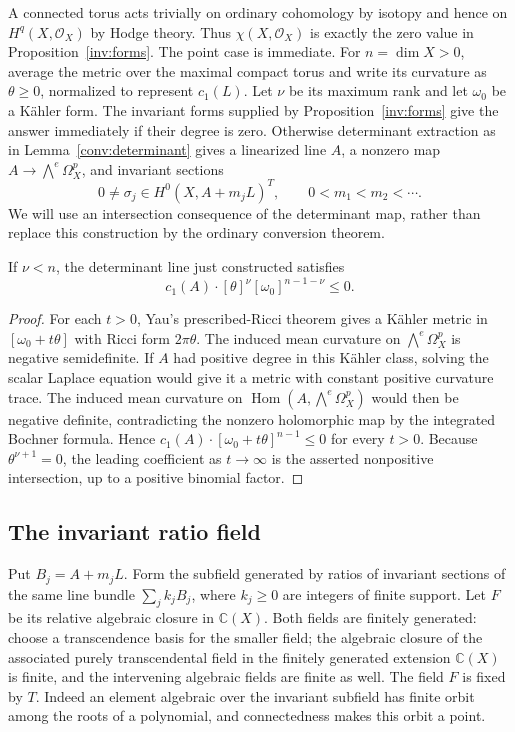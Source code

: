 A connected torus acts trivially on ordinary cohomology by isotopy and
hence on $H^q(X,\mathcal O_X)$ by Hodge theory.  Thus
$\chi(X,\mathcal O_X)$ is exactly the zero value in
Proposition~\ref{inv:forms}.  The point case is immediate.  For
$n=\dim X>0$, average the metric over the maximal compact torus and
write its curvature as $\theta\ge0$, normalized to represent $c_1(L)$.
Let $\nu$ be its maximum rank and let $\omega_0$ be a K\"ahler form.
The invariant forms supplied by Proposition~\ref{inv:forms} give the
answer immediately if their degree is zero.  Otherwise determinant
extraction as in Lemma~\ref{conv:determinant} gives a linearized line
$A$, a nonzero map $A\to\bigwedge^e\Omega_X^p$, and invariant sections
\begin{equation}\label{inv:determinant-sequence}
 0\ne\sigma_j\in H^0(X,A+m_jL)^T,
 \qquad 0<m_1<m_2<\cdots.
\end{equation}
We will use an intersection consequence of the determinant map, rather
than replace this construction by the ordinary conversion theorem.

\begin{lemma}\label{inv:null-slope}
If $\nu<n$, the determinant line just constructed satisfies
\[
 c_1(A)\cdot[\theta]^\nu[\omega_0]^{n-1-\nu}\le0.
\]
\end{lemma}
\begin{proof}
For each $t>0$, Yau's prescribed-Ricci theorem \cite{Yau1978} gives
a K\"ahler metric in $[\omega_0+t\theta]$ with Ricci form
$2\pi\theta$.  The induced mean curvature on
$\bigwedge^e\Omega_X^p$ is negative semidefinite.  If $A$ had
positive degree in this K\"ahler class, solving the scalar Laplace
equation would give it a metric with constant positive curvature
trace.  The induced mean curvature on
$\operatorname{Hom}(A,\bigwedge^e\Omega_X^p)$ would then be negative
definite, contradicting the nonzero holomorphic map by the integrated
Bochner formula.  Hence
$c_1(A)\cdot[\omega_0+t\theta]^{n-1}\le0$ for every $t>0$.
Because $\theta^{\nu+1}=0$, the leading coefficient as $t\to\infty$
is the asserted nonpositive intersection, up to a positive binomial
factor.
\end{proof}

\subsection{The invariant ratio field}

Put $B_j=A+m_jL$.  Form the subfield generated by ratios of invariant
sections of the same line bundle $\sum_j k_jB_j$, where $k_j\ge0$
are integers of finite support.  Let $F$ be its relative algebraic
closure in $\mathbb C(X)$.  Both fields are finitely generated:
choose a transcendence basis for the smaller field; the algebraic
closure of the associated purely transcendental field in the finitely
generated extension $\mathbb C(X)$ is finite, and the intervening
algebraic fields are finite as well.  The field $F$ is fixed by $T$.
Indeed an element algebraic over the invariant subfield has finite
orbit among the roots of a polynomial, and connectedness makes this
orbit a point.

